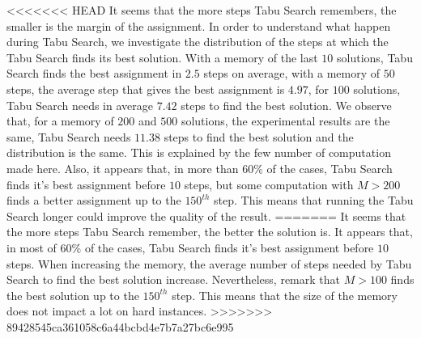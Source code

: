 <<<<<<< HEAD
It seems that the more steps Tabu Search remembers, the smaller is the margin of the assignment.
In order to understand what happen during Tabu Search, we investigate the distribution of the steps at which the Tabu Search finds its best solution.
With a memory of the last $10$ solutions, Tabu Search finds the best assignment in $2.5$ steps on average, with a memory of $50$ steps, the average step that gives the best assignment is $4.97$, for $100$ solutions, Tabu Search needs in average $7.42$ steps to find the best solution. We observe that, for a memory of $200$ and $500$ solutions, the experimental results are the same, Tabu Search needs $11.38$ steps to find the best solution and the distribution is the same. This is explained by the few number of computation made here.
Also, it appears that, in more than $60\%$ of the cases, Tabu Search finds it's best assignment before $10$ steps, but some computation with $M > 200$ finds a better assignment up to the $150^{th}$ step. This means that running the Tabu Search longer could improve the quality of the result. 
=======
It seems that the more steps Tabu Search remember, the better the solution is.
It appears that, in most of $60\%$ of the cases, Tabu Search finds it's best assignment before $10$ steps. When increasing the memory, the average number of steps needed by Tabu Search to find the best solution increase. Nevertheless, remark that $M > 100$ finds the best solution up to the $150^{th}$ step. This means that the size of the memory does not impact a lot on hard instances.
>>>>>>> 89428545ca361058c6a44bcbd4e7b7a27bc6e995


